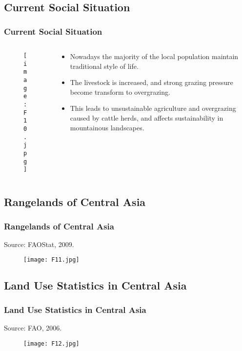 \documentclass[pdflatex,compress,8pt,
	xcolor={dvipsnames,dvipsnames,svgnames,x11names,table},
	hyperref={colorlinks = true,
	breaklinks = true, 
	urlcolor = NavyBlue, 
	breaklinks = true}]{beamer}
\begin{document}
\subsection{Current Social Situation}
\begin{frame}\frametitle{Current Social Situation}
\begin{minipage}[0.4\textheight]{\textwidth}
\begin{columns}[T]
\begin{column}{0.65\textwidth}
\vspace{2em}
\begin{figure}[H]
	\centering
		\texttt{[image: F10.jpg]}
\end{figure}
\end{column}
\begin{column}{0.35\textwidth}
\vspace{4em} 
\begin{itemize}
	\item Nowadays the majority of the local population maintain traditional style of life. \pause
	\item The livestock is increased, and strong grazing pressure become transform to overgrazing. \pause
	\item This leads to unsustainable agriculture and overgrazing caused by cattle herds, and affects sustainability in mountainous landscapes.
\end{itemize}
\end{column}
\end{columns}
\end{minipage}

\end{frame}

\subsection{Rangelands of Central Asia}
\begin{frame}\frametitle{Rangelands of Central Asia}
Source: FAOStat, 2009. 
\vspace{2em}
\begin{figure}[H]
	\centering
		\texttt{[image: F11.jpg]}
\end{figure}
\end{frame}

\subsection{Land Use Statistics in Central Asia}
\begin{frame}\frametitle{Land Use Statistics in Central Asia}
Source: FAO, 2006. 
\vspace{2em}
\begin{figure}[H]
	\centering
		\texttt{[image: F12.jpg]}
\end{figure}
\end{frame}
\end{document}
